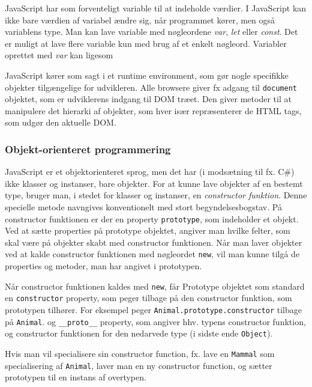\documentclass[]{article}
\begin{document}
JavaScript har som forventeligt variable til at indeholde værdier. I
JavaScript kan ikke bare værdien af variabel ændre sig, når programmet
kører, men også variablens type. Man kan lave variable med nøgleordene
\emph{var}, \emph{let} eller \emph{const}. Det er muligt at lave flere
variable kun med brug af et enkelt nøgleord. Variabler oprettet med
\emph{var} kan ligesom

JavaScript kører som sagt i et runtime environment, som gør nogle
specifikke objekter tilgængelige for udvikleren. Alle browsere giver fx
adgang til \texttt{document} objektet, som er udviklerens indgang til
DOM træet. Den giver metoder til at manipulere det hierarki af objekter,
som hver især repræsenterer de HTML tags, som udgør den aktuelle DOM.

\hypertarget{objekt-orienteret-programmering}{%
\subsubsection{Objekt-orienteret
programmering}\label{objekt-orienteret-programmering}}

JavaScript er et objektorienteret sprog, men det har (i modsætning til
fx. C\#) ikke klasser og instanser, bare objekter. For at kunne lave
objekter af en bestemt type, bruger man, i stedet for klasser og
instanser, en \emph{constructor funktion}. Denne specielle metode
navngives konventionelt med stort begyndelsesbogstav. På constructor
funktionen er der en property \texttt{prototype}, som indeholder et
objekt. Ved at sætte properties på prototype objektet, angiver man
hvilke felter, som skal være på objekter skabt med constructor
funktionen. Når man laver objekter ved at kalde constructor funktionen
med nøgleordet \texttt{new}, vil man kunne tilgå de properties og
metoder, man har angivet i prototypen.

Når constructor funktionen kaldes med \texttt{new}, får Prototype
objektet som standard en \texttt{constructor} property, som peger
tilbage på den constructor funktion, som prototypen tilhører. For
eksempel peger \texttt{Animal.prototype.constructor} tilbage på
\texttt{Animal}. og \texttt{\_\_proto\_\_} property, som angiver hhv.
typens constructor funktion, og constructor funktionen for den nedarvede
type (i sidste ende \texttt{Object}).

Hvis man vil specialisere sin constructor function, fx. lave en
\texttt{Mammal} som specialisering af \texttt{Animal}, laver man en ny
constructor function, og sætter prototypen til en instans af overtypen.
\end{document}
